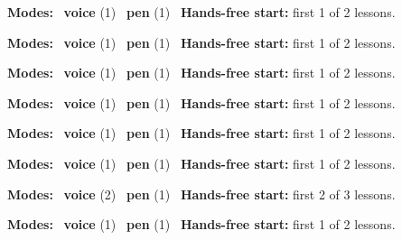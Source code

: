 \expandafter\def\csname hlchaptermodality14\endcsname{%
  {\small\noindent
    \textbf{Modes:} \hlvoicesign{}~\textbf{voice} (1) \quad \hlpensign{}~\textbf{pen} (1)\quad
    \hlvoicesign{}~\textbf{Hands-free start:} first 1 of 2 lessons.%
    \par}\medskip
}

\expandafter\def\csname hlchaptermodality15\endcsname{%
  {\small\noindent
    \textbf{Modes:} \hlvoicesign{}~\textbf{voice} (1) \quad \hlpensign{}~\textbf{pen} (1)\quad
    \hlvoicesign{}~\textbf{Hands-free start:} first 1 of 2 lessons.%
    \par}\medskip
}

\expandafter\def\csname hlchaptermodality16\endcsname{%
  {\small\noindent
    \textbf{Modes:} \hlvoicesign{}~\textbf{voice} (1) \quad \hlpensign{}~\textbf{pen} (1)\quad
    \hlvoicesign{}~\textbf{Hands-free start:} first 1 of 2 lessons.%
    \par}\medskip
}

\expandafter\def\csname hlchaptermodality17\endcsname{%
  {\small\noindent
    \textbf{Modes:} \hlvoicesign{}~\textbf{voice} (1) \quad \hlpensign{}~\textbf{pen} (1)\quad
    \hlvoicesign{}~\textbf{Hands-free start:} first 1 of 2 lessons.%
    \par}\medskip
}

\expandafter\def\csname hlchaptermodality18\endcsname{%
  {\small\noindent
    \textbf{Modes:} \hlvoicesign{}~\textbf{voice} (1) \quad \hlpensign{}~\textbf{pen} (1)\quad
    \hlvoicesign{}~\textbf{Hands-free start:} first 1 of 2 lessons.%
    \par}\medskip
}

\expandafter\def\csname hlchaptermodality19\endcsname{%
  {\small\noindent
    \textbf{Modes:} \hlvoicesign{}~\textbf{voice} (1) \quad \hlpensign{}~\textbf{pen} (1)\quad
    \hlvoicesign{}~\textbf{Hands-free start:} first 1 of 2 lessons.%
    \par}\medskip
}

\expandafter\def\csname hlchaptermodality20\endcsname{%
  {\small\noindent
    \textbf{Modes:} \hlvoicesign{}~\textbf{voice} (2) \quad \hlpensign{}~\textbf{pen} (1)\quad
    \hlvoicesign{}~\textbf{Hands-free start:} first 2 of 3 lessons.%
    \par}\medskip
}

\expandafter\def\csname hlchaptermodality21\endcsname{%
  {\small\noindent
    \textbf{Modes:} \hlvoicesign{}~\textbf{voice} (1) \quad \hlpensign{}~\textbf{pen} (1)\quad
    \hlvoicesign{}~\textbf{Hands-free start:} first 1 of 2 lessons.%
    \par}\medskip
}

